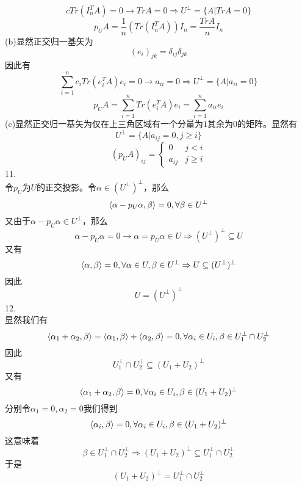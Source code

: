 \documentclass[utf8]{ctexart}
\begin{document}
\[cTr(I_n^TA)=0\rightarrow TrA=0\Rightarrow U^\bot=\{A|TrA=0\}\]
\[p_{U}A=\frac{1}{n}(Tr(I_n^TA))I_n=\frac{TrA}{n}I_n\]
(b)显然正交归一基矢为
\[(e_i)_{jk}=\delta_{ij}\delta_{jk}\]
因此有
\[\sum_{i=1}^nc_iTr(e_i^TA)e_i=0\rightarrow a_{ii}=0\Rightarrow U^\bot=\{A|a_{ii}=0\}\]
\[p_{U}A=\sum_{i=1}^nTr(e_i^TA)e_i=\sum_{i=1}^na_{ii}e_i\]
(c)显然正交归一基矢为仅在上三角区域有一个分量为$1$其余为$0$的矩阵。显然有
\[U^\bot=\{A|a_{ij}=0,j\ge i\}\]
\[(p_{U}A)_{ij}=\begin{cases}
	0&j<i\\
	a_{ij}&j\ge i
\end{cases}\]
11.\\
令$p_U$为$U$的正交投影。令$\alpha\in (U^\bot)^\bot$，那么
\[\braket{\alpha-p_U\alpha,\beta}=0,\forall\beta\in U^\bot\]
又由于$\alpha-p_U\alpha\in U^\bot$，那么
\[\alpha-p_U\alpha=0\rightarrow\alpha=p_U\alpha\in U\Rightarrow (U^\bot)^\bot\subseteq U\]
又有
\[\braket{\alpha,\beta}=0,\forall\alpha\in U,\beta\in U^\bot\Rightarrow U\subseteq (U^\bot)^\bot\]
因此
\[U=(U^\bot)^\bot\]
12.\\
显然我们有
\[\braket{\alpha_1+\alpha_2,\beta}=\braket{\alpha_1,\beta}+\braket{\alpha_2,\beta}=0,\forall\alpha_i\in U_i,\beta\in U_1^\bot\cap U_2^\bot\]
因此
\[U_1^\bot\cap U_2^\bot\subseteq(U_1+U_2)^\bot\]
又有
\[\braket{\alpha_1+\alpha_2,\beta}=0,\forall\alpha_i\in U_i,\beta\in (U_1+U_2)^\bot\]
分别令$\alpha_1=0,\alpha_2=0$我们得到
\[\braket{\alpha_i,\beta}=0,\forall\alpha_i\in U_i,\beta\in (U_1+U_2)^\bot\]
这意味着
\[\beta\in U_1^\bot\cap U_2^\bot\Rightarrow (U_1+U_2)^\bot\subseteq U_1^\bot\cap U_2^\bot\]
于是
\[(U_1+U_2)^\bot=U_1^\bot\cap U_2^\bot\]
\end{document}
